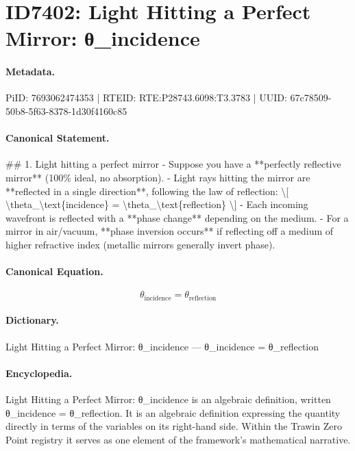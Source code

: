 \section*{ID7402: Light Hitting a Perfect Mirror: θ\_incidence}
\paragraph{Metadata.}
PiID: 7693062474353 | RTEID: RTE:P28743.6098:T3.3783 | UUID: 67c78509-50b8-5f63-8378-1d30f4160c85

\paragraph{Canonical Statement.}
\#\# 1. Light hitting a perfect mirror - Suppose you have a **perfectly reflective mirror** (100\% ideal, no absorption). - Light rays hitting the mirror are **reflected in a single direction**, following the law of reflection: \textbackslash{}[ \textbackslash{}theta\_\textbackslash{}text\{incidence\} = \textbackslash{}theta\_\textbackslash{}text\{reflection\} \textbackslash{}] - Each incoming wavefront is reflected with a **phase change** depending on the medium. - For a mirror in air/vacuum, **phase inversion occurs** if reflecting off a medium of higher refractive index (metallic mirrors generally invert phase).

\paragraph{Canonical Equation.}
\[
\theta_\text{incidence} = \theta_\text{reflection}
\]

\paragraph{Dictionary.}
Light Hitting a Perfect Mirror: θ\_incidence — θ\_incidence = θ\_reflection

\paragraph{Encyclopedia.}
Light Hitting a Perfect Mirror: θ\_incidence is an algebraic definition, written θ\_incidence = θ\_reflection. It is an algebraic definition expressing the quantity directly in terms of the variables on its right-hand side. Within the Trawin Zero Point registry it serves as one element of the framework's mathematical narrative.
